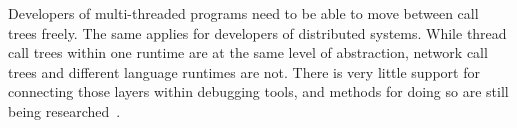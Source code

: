 Developers of multi-threaded programs need to be able to move between
call trees freely. The same applies for developers of distributed
systems. While thread call trees within one runtime are at the same
level of abstraction, network call trees and different language
runtimes are not. There is very little support for connecting those
layers within debugging tools, and methods for doing so are still
being researched~\cite{Stanley2009,Geels2006Replay}.

